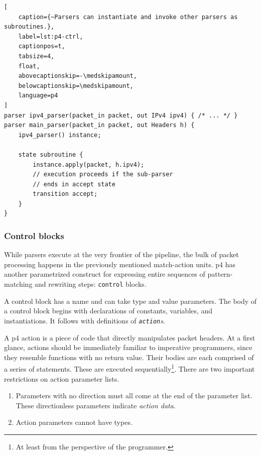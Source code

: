 \begin{lstlisting}[
	caption={~Parsers can instantiate and invoke other parsers as subroutines.},
	label=lst:p4-ctrl,
	captionpos=t,
	tabsize=4,
	float,
	abovecaptionskip=-\medskipamount,
	belowcaptionskip=\medskipamount,
	language=p4
]
parser ipv4_parser(packet_in packet, out IPv4 ipv4) { /* ... */ }
parser main_parser(packet_in packet, out Headers h) {
	ipv4_parser() instance;

	state subroutine {
		instance.apply(packet, h.ipv4);
		// execution proceeds if the sub-parser
		// ends in accept state
		transition accept;
	}
}
\end{lstlisting}



\subsubsection*{Control blocks}

While parsers execute at the very frontier of the pipeline, the bulk of packet
processing happens in the previously mentioned match-action units. \acrshort{p4}
has another parametrized construct for expressing entire sequences of
pattern-matching and rewriting steps: \texttt{control} blocks.

A control block has a name and can take type and value parameters. The body of a
control block begins with declarations of constants, variables, and
instantiations. It follows with definitions of \emph{\texttt{action}s}.

A \acrshort{p4} action is a piece of code that directly
manipulates packet headers. At a first glance, actions should be immediately
familiar to imperative programmers, since they resemble functions with no return
value. Their bodies are each comprised of a series of statements. These are
executed sequentially\footnote{At least from the perspective of the
programmer.}. There are two important restrictions on action parameter lists.

\begin{enumerate}
	\item Parameters with no direction must all come at the end of the parameter
	list. These directionless parameters indicate \emph{action
	data}.
	\item Action parameters cannot have \extern{} types.
\end{enumerate}

